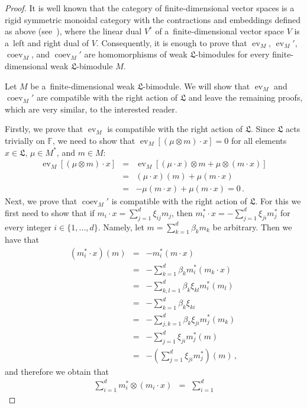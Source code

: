 \documentclass{jonasart}
\DeclareMathOperator{\coev}{coev}
\DeclareMathOperator{\ev}{ev}
\newcommand{\fbb}{\mathbb{F}}
\newcommand{\lf}{\mathfrak{L}}
\begin{document}
	\begin{proof}
		It is well known that the category of finite-dimensional vector spaces is a rigid symmetric monoidal category with the contractions and embeddings defined as above (see~\cite[Example 2.10.12]{EGNO}), where the linear dual $V^*$ of a~finite-dimensional vector space $V$ is a~left and right dual of $V$. Consequently, it is enough to prove that $\ev_M$, $\ev_M '$,
		$\coev_M$, and $\coev_M '$ are homomorphisms of weak $\lf$-bimodules for every finite-dimensional weak $\lf$-bimodule $M$.

		Let $M$ be a~finite-dimensional weak $\lf$-bimodule. We will show that
		$\ev_M$ and $\coev_M '$ are compatible with the right action of $\lf$ and leave the remaining proofs, which are very similar, to the interested reader.

		Firstly, we prove that $\ev_M$ is compatible with the right action of $\lf$. Since $\lf$ acts trivially on $\fbb$, we need to show that $\ev_M [(\mu
		\otimes m)\cdot x]=0$ for all elements $x\in\lf$, $\mu\in M^*$, and
		$m\in M$:
		\begin{eqnarray*}
			\ev_M [(\mu\otimes m)\cdot x] & = & \ev_M [(\mu\cdot x)\otimes m+
			\mu\otimes(m\cdot x)]\\
			& = & (\mu\cdot x)(m)+\mu(m\cdot x)\\
			& = & -\mu(m\cdot x)+\mu(m\cdot x)=0\,.
		\end{eqnarray*}
		Next, we prove that $\coev_M'$ is compatible with the right action of $\lf$. For this we first need to show that if $m_i\cdot x=\sum_{j=1}^d\xi_{ij}
		m_j$, then $m_i^*\cdot x=-\sum_{j=1}^d\xi_{ji}m_j^*$ for every integer $i\in\{1,\dots,d\}$. Namely, let $m=\sum_{k=1}^d\beta_k m_k$ be arbitrary. Then we have that
		\begin{eqnarray*}
			(m_i^*\cdot x)(m) & = & -m_i^* (m\cdot x)\\
			& = & -\sum_{k=1}^d\beta_k m_i^* (m_k\cdot x)\\
			& = & -\sum_{k,l=1}^d\beta_k\xi_{kl}m_i^* (m_l )\\
			& = & -\sum_{k=1}^d\beta_k\xi_{ki}\\
			& = & -\sum_{j,k=1}^d\beta_k\xi_{ji}m_j^* (m_k )\\
			& = & -\sum_{j=1}^d\xi_{ji}m_j^* (m)\\
			& = & -\left(\sum_{j=1}^d\xi_{ji}m_j^*\right)(m)\,,
		\end{eqnarray*}
		and therefore we obtain that
		\begin{eqnarray*}
			\sum_{i=1}^d m_i^*\otimes(m_i\cdot x) & = & \sum_{i=1}^d

\end{eqnarray*}
\end{proof}
\end{document}
